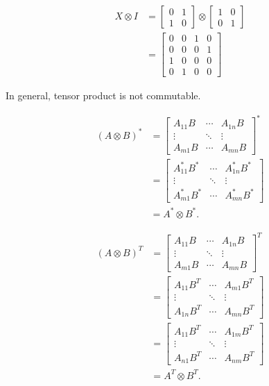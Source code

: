 \begin{align*}
	X \otimes I &= \begin{bmatrix}
		0 & 1 \\
		1 & 0
	\end{bmatrix}
	\otimes
	\begin{bmatrix}
		1 & 0 \\
		0 & 1
	\end{bmatrix}\\
	&= \begin{bmatrix}
	0 & 0 & 1 & 0 \\
	0 & 0 & 0 & 1 \\
	1 & 0 & 0 & 0 \\
	0 & 1 & 0 & 0
	\end{bmatrix}
\end{align*}

In general, tensor product is not commutable.



\begin{align*}
	(A \otimes B)^*
	&=
	\begin{bmatrix}
		A_{11} B & \cdots & A_{1n} B \\
		\vdots & \ddots  & \vdots \\
		A_{m1}B & \cdots & A_{mn} B
	\end{bmatrix}^* \\
	&=
	\begin{bmatrix}
		A_{11}^* B^* & \cdots & A_{1n}^* B^* \\
		\vdots & \ddots  & \vdots \\
		A_{m1}^* B^* & \cdots & A_{mn}^* B^*
	\end{bmatrix} \\
	&= A^* \otimes B^*.
\end{align*}


\begin{align*}
	(A\otimes B)^T &=
	\begin{bmatrix}
		A_{11} B & \cdots & A_{1n} B \\
		\vdots & \ddots  & \vdots \\
		A_{m1}B & \cdots & A_{mn} B
	\end{bmatrix}^T \\
	&=
	\begin{bmatrix}
		A_{11} B^T & \cdots & A_{m1} B^T \\
		\vdots & \ddots  & \vdots \\
		A_{1n} B^T & \cdots & A_{mn} B^T
	\end{bmatrix} \\
	&=
	\begin{bmatrix}
		A_{11} B^T & \cdots & A_{1m} B^T \\
		\vdots & \ddots  & \vdots \\
		A_{n1} B^T & \cdots & A_{nm} B^T
	\end{bmatrix} \\
	&= A^T \otimes B^T.
\end{align*}


